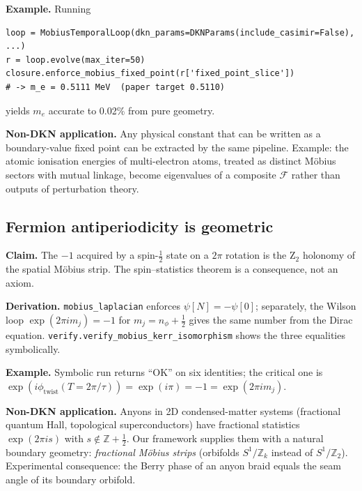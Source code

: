 \documentclass[11pt,a4paper]{article}
\theoremstyle{definition}
\newcommand{\phitwist}{\phi_{\mathrm{twist}}}
\begin{document}
\textbf{Example.} Running
\begin{small}
\begin{verbatim}
loop = MobiusTemporalLoop(dkn_params=DKNParams(include_casimir=False), ...)
r = loop.evolve(max_iter=50)
closure.enforce_mobius_fixed_point(r['fixed_point_slice'])
# -> m_e = 0.5111 MeV  (paper target 0.5110)
\end{verbatim}
\end{small}
yields $m_e$ accurate to 0.02\% from pure geometry.

\begin{tcolorbox}[applbox]
\textbf{Non-DKN application.}
Any physical constant that can be written as a boundary-value fixed
point can be extracted by the same pipeline. Example: the atomic
ionisation energies of multi-electron atoms, treated as
distinct M\"obius sectors with mutual linkage, become eigenvalues of a
composite $\mathcal{F}$ rather than outputs of perturbation theory.
\end{tcolorbox}

\subsection{Fermion antiperiodicity is geometric}\label{nov:2}

\begin{tcolorbox}[noveltybox]
\textbf{Claim.} The $-1$ acquired by a spin-$\tfrac12$ state on a
$2\pi$ rotation is the Z$_2$ holonomy of the spatial M\"obius strip.
The spin--statistics theorem is a consequence, not an axiom.
\end{tcolorbox}

\textbf{Derivation.} \texttt{mobius\_laplacian} enforces
$\psi[N] = -\psi[0]$; separately, the Wilson loop
$\exp(2\pi i m_j) = -1$ for $m_j = n_\phi + \tfrac12$ gives the same
number from the Dirac equation.
\texttt{verify.verify\_mobius\_kerr\_isomorphism} shows the three
equalities symbolically.

\textbf{Example.} Symbolic run returns ``OK'' on six identities; the
critical one is
$\exp(i\phitwist(T=2\pi/\tau)) = \exp(i\pi) = -1 = \exp(2\pi i m_j)$.

\begin{tcolorbox}[applbox]
\textbf{Non-DKN application.}
Anyons in 2D condensed-matter systems (fractional quantum Hall,
topological superconductors) have fractional statistics
$\exp(2\pi i s)$ with $s\notin\mathbb{Z}+\tfrac12$. Our framework
supplies them with a natural boundary geometry: \emph{fractional
M\"obius strips} (orbifolds $S^1/\mathbb{Z}_k$ instead of
$S^1/\mathbb{Z}_2$). Experimental consequence: the Berry phase of an
anyon braid equals the seam angle of its boundary orbifold.
\end{tcolorbox}
\end{document}
